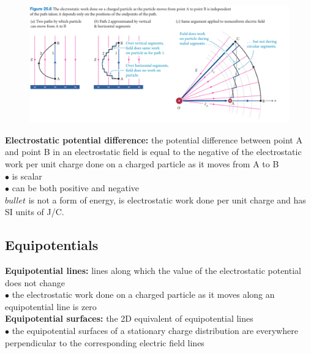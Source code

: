         \begin{figure}[hbt!]
            \centering
            \includegraphics[scale = 0.75]{Resources/25.2_Electrostatic_Work}
        \end{figure}

        \textbf{Electrostatic potential difference:} the potential difference between point A and point B in an electrostatic field is equal to the negative of the electrostatic work per unit charge done on a charged
        particle as it moves from A to B \\
        $\bullet$ is scalar \\
        $\bullet$ can be both positive and negative \\
        $bullet$ is not a form of energy, is electrostatic work done per unit charge and has SI units of J/C.

    \subsection{Equipotentials}     %

        \textbf{Equipotential lines:} lines along which the value of the electrostatic potential does not change \\
        $\bullet$ the electrostatic work done on a charged particle as it moves along an equipotential line is zero \\
        \textbf{Equipotential surfaces:} the 2D equivalent of equipotential lines \\
        $\bullet$ the equipotential surfaces of a stationary charge distribution are everywhere perpendicular to the corresponding electric field lines

